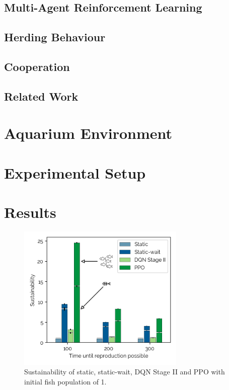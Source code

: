 \documentclass[letterpaper]{article}
\begin{document}
\subsection{Multi-Agent Reinforcement Learning}

\blindtext[3]

\subsection{Herding Behaviour}

\blindtext[2]

\subsection{Cooperation}

\blindtext[2]

\subsection{Related Work}

\blindtext[5]

\section{Aquarium Environment}

\blindtext[5]

\section{Experimental Setup}

\blindtext[2]

\section{Results}

\begin{figure}[t]
\begin{center}
\includegraphics[width=8cm]{figures/dqncomp1fish_2.png}
\caption{Sustainability of static, static-wait, DQN Stage II and PPO with initial fish population of 1.}
\label{fig:dqncomp1}
\end{center}
\end{figure}
\end{document}
